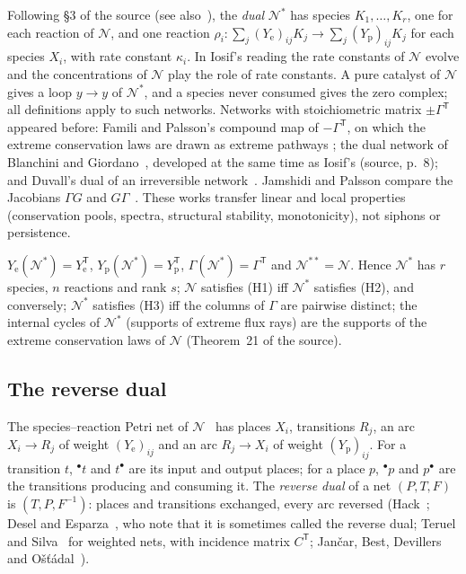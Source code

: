 \documentclass[11pt,a4paper]{report}
\newcommand{\Net}{\mathcal{N}}
\newcommand{\Nd}{\mathcal{N}^{*}}
\newcommand{\Ye}{Y_{\mathrm e}}
\newcommand{\Yp}{Y_{\mathrm p}}
\newcommand{\tp}{^{\mathsf T}}
\begin{document}
Following §3 of the source (see also~\autocite{BlanchiniGiordano2022}), the \emph{dual} \(\Nd\) has species
\(K_1,\dots,K_r\), one for each reaction of \(\Net\), and one reaction \(\rho_i\colon\sum_j(\Ye)_{ij}K_j\to
\sum_j(\Yp)_{ij}K_j\) for each species \(X_i\), with rate constant \(\kappa_i\). In Iosif's reading the rate
constants of \(\Net\) evolve and the concentrations of \(\Net\) play the role of rate constants. A pure catalyst of
\(\Net\) gives a loop \(y\to y\) of \(\Nd\), and a species never consumed gives the zero complex; all definitions
apply to such networks. Networks with stoichiometric matrix \(\pm\Gamma\tp\) appeared before: Famili and Palsson's
compound map of \(-\Gamma\tp\), on which the extreme conservation laws are drawn as extreme pathways
\autocite{FamiliPalsson2003}; the dual network of Blanchini and Giordano~\autocite{BlanchiniGiordano2022}, developed at
the same time as Iosif's (source, p.~8); and Duvall's dual of an irreversible network~\autocite{Duvall2024}. Jamshidi
and Palsson compare the Jacobians \(\Gamma G\) and \(G\Gamma\)~\autocite{JamshidiPalsson2009}. These works transfer
linear and local properties (conservation pools, spectra, structural stability, monotonicity), not siphons or
persistence.

\begin{lemma}\label{lem:transpose}
\(\Ye(\Nd)=\Ye\tp\), \(\Yp(\Nd)=\Yp\tp\), \(\Gamma(\Nd)=\Gamma\tp\) and \(\Net^{**}=\Net\). Hence \(\Nd\) has \(r\) species,
\(n\) reactions and rank \(s\); \(\Net\) satisfies (H1) iff \(\Nd\) satisfies (H2), and conversely; \(\Nd\)
satisfies (H3) iff the columns of \(\Gamma\) are pairwise distinct; the internal cycles of \(\Nd\) (supports of
extreme flux rays) are the supports of the extreme conservation laws of \(\Net\) (Theorem~21 of the source).
\end{lemma}

\subsection{The reverse dual}

The species--reaction Petri net of \(\Net\)~\autocite{AngeliDeLeenheerSontag2007} has places \(X_i\), transitions
\(R_j\), an arc \(X_i\to R_j\) of weight \((\Ye)_{ij}\) and an arc \(R_j\to X_i\) of weight \((\Yp)_{ij}\). For a
transition \(t\), \({}^\bullet t\) and \(t^\bullet\) are its input and output places; for a place \(p\), \({}^\bullet p\)
and \(p^\bullet\) are the transitions producing and consuming it. The \emph{reverse dual} of a net \((P,T,F)\) is
\((T,P,F^{-1})\): places and transitions exchanged, every arc reversed (Hack~\autocite{Hack1972}; Desel and
Esparza~\autocite[Def.~6.19]{DeselEsparza1995}, who note that it is sometimes called the reverse dual; Teruel and
Silva~\autocite[§2]{TeruelSilva1996} for weighted nets, with incidence matrix \(C\tp\); Jančar, Best, Devillers and
Ošťádal~\autocite{JancarBestDevillersOstadal2026}).
\end{document}

